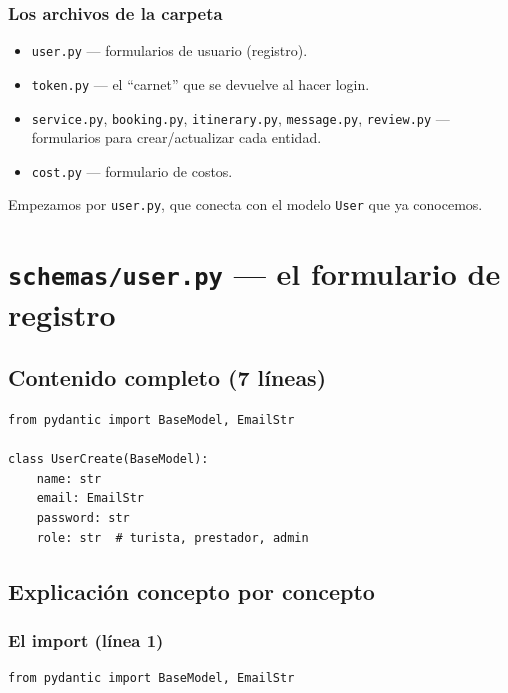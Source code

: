 \documentclass[11pt,a4paper]{article}
\begin{document}
\subsubsection{Los archivos de la carpeta}

\begin{itemize}
    \item \texttt{user.py} --- formularios de usuario (registro).
    \item \texttt{token.py} --- el ``carnet'' que se devuelve al hacer login.
    \item \texttt{service.py}, \texttt{booking.py}, \texttt{itinerary.py}, \texttt{message.py}, \texttt{review.py} --- formularios para crear/actualizar cada entidad.
    \item \texttt{cost.py} --- formulario de costos.
\end{itemize}

Empezamos por \texttt{user.py}, que conecta con el modelo \texttt{User} que ya conocemos.

\section{\texttt{schemas/user.py} --- el formulario de registro}

\subsection{Contenido completo (7 líneas)}

\begin{lstlisting}
from pydantic import BaseModel, EmailStr

class UserCreate(BaseModel):
    name: str
    email: EmailStr
    password: str
    role: str  # turista, prestador, admin
\end{lstlisting}

\subsection{Explicación concepto por concepto}

\subsubsection{El import (línea 1)}

\begin{lstlisting}
from pydantic import BaseModel, EmailStr
\end{lstlisting}
\end{document}
